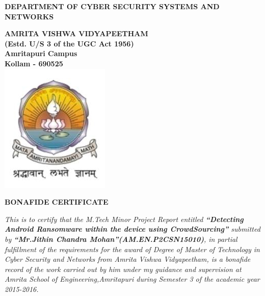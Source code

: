\begin{center}


{\normalsize {\bfseries{DEPARTMENT OF CYBER SECURITY SYSTEMS AND NETWORKS\\[1ex]}}}


{\normalsize {\bfseries{AMRITA VISHWA VIDYAPEETHAM \\ (Estd. U/S 3 of the UGC Act 1956) \\[1ex]Amritapuri  Campus \\[1ex]
Kollam - 690525\\[1ex]}}}
\vspace{5mm}
    \includegraphics[scale=.3]{kkk.jpg}


                \rmfamily\bfseries\upshape\Large
\vspace{5mm}
                BONAFIDE CERTIFICATE \\[2ex] %

\end{center}

        \vspace{1pt}    

\rmfamily\mdseries\upshape\normalsize                    

\justify
\textit{
This is to certify that the M.Tech Minor Project Report entitled
\textbf{``Detecting Android Ransomware within the device using CrowdSourcing''} submitted by \textbf{``Mr.Jithin Chandra Mohan''(AM.EN.P2CSN15010)}, in partial fulfillment of the requirements for
the award of Degree of Master of Technology in Cyber Security and Networks from Amrita Vishwa Vidyapeetham,
is a bonafide
record of the work carried out by him under my guidance and supervision at
Amrita School of Engineering,Amritapuri during Semester 3 of the academic
year 2015-2016.
}

